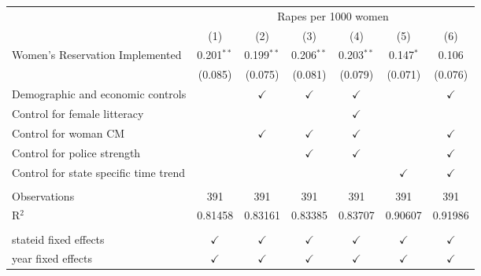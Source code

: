 \begingroup
\centering
\begin{tabular}{lcccccc}
   \toprule
    & \multicolumn{6}{c}{Rapes per 1000 women}\\
                                         & (1)           & (2)           & (3)           & (4)           & (5)           & (6)\\  
   \midrule 
   Women's Reservation Implemented       & 0.201$^{**}$  & 0.199$^{**}$  & 0.206$^{**}$  & 0.203$^{**}$  & 0.147$^{*}$   & 0.106\\   
                                         & (0.085)       & (0.075)       & (0.081)       & (0.079)       & (0.071)       & (0.076)\\   
   Demographic and economic controls     &               & $\checkmark$  & $\checkmark$  & $\checkmark$  &               & $\checkmark$\\   
   Control for female litteracy          &               &               &               & $\checkmark$  &               & \\  
   Control for woman CM                  &               & $\checkmark$  & $\checkmark$  & $\checkmark$  &               & $\checkmark$\\   
   Control for police strength           &               &               & $\checkmark$  & $\checkmark$  &               & $\checkmark$\\   
   Control for state specific time trend &               &               &               &               & $\checkmark$  & $\checkmark$\\   
    \\
   Observations                          & 391           & 391           & 391           & 391           & 391           & 391\\  
   R$^2$                                 & 0.81458       & 0.83161       & 0.83385       & 0.83707       & 0.90607       & 0.91986\\  
    \\
   stateid fixed effects                 & $\checkmark$  & $\checkmark$  & $\checkmark$  & $\checkmark$  & $\checkmark$  & $\checkmark$\\   
   year fixed effects                    & $\checkmark$  & $\checkmark$  & $\checkmark$  & $\checkmark$  & $\checkmark$  & $\checkmark$\\   
   \bottomrule
\end{tabular}
\par\endgroup



